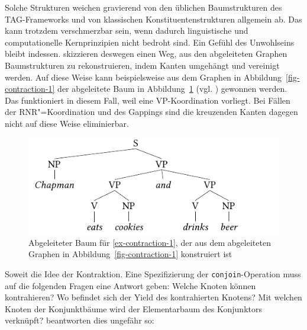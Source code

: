 Solche Strukturen weichen gravierend von den üblichen Baumstrukturen des TAG-Frameworks und von klassischen Konstituentenstrukturen allgemein ab. Das kann trotzdem verschmerzbar sein, wenn dadurch linguistische und computationelle Kernprinzipien nicht bedroht sind. Ein Gefühl des Unwohlseins bleibt indessen. \cite{Sarkar:Joshi:97} skizzieren deswegen einen Weg, aus den abgeleiteten Graphen Baumstrukturen zu rekonstruieren, indem Kanten umgehängt und vereinigt werden. Auf diese Weise kann beispielsweise aus dem Graphen in Abbildung~\ref{fig-contraction-1} der abgeleitete Baum in Abbildung~\ref{fig-kontraktion-baumisierung} (vgl. \citealt[Figure~16]{Sarkar:Joshi:97}) gewonnen werden. Das funktioniert in diesem Fall, weil eine VP-Koordination vorliegt. Bei Fällen der RNR"=Koordination und des Gappings sind die kreuzenden Kanten dagegen nicht auf diese Weise eliminierbar. 

\begin{figure}[t]
\centering
\includegraphics{graphics/abb87.pdf}
\caption{\label{fig-kontraktion-baumisierung}Abgeleiteter Baum für \ref{ex-contraction-1}, der aus dem abgeleiteten Graphen in Abbildung~\ref{fig-contraction-1} konstruiert ist}
\end{figure}

Soweit die Idee der Kontraktion. Eine Spezifizierung der {\tt conjoin}-Operation muss auf die folgenden Fragen eine Antwort geben: Welche Knoten können kontrahieren? Wo befindet sich der Yield des kontrahierten Knotens? Mit welchen Knoten der Konjunktbäume wird der Elementarbaum des Konjunktors verknüpft? \cite{Sarkar:Joshi:96,Sarkar:Joshi:97} beantworten dies ungefähr so: 

